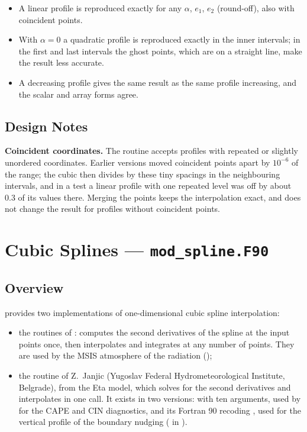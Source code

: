 \begin{itemize}
  \item A linear profile is reproduced exactly for any $\alpha$, $e_1$,
        $e_2$ (round-off), also with coincident points.
  \item With $\alpha = 0$ a quadratic profile is reproduced exactly in the
        inner intervals; in the first and last intervals the ghost points,
        which are on a straight line, make the result less accurate.
  \item A decreasing profile gives the same result as the same profile
        increasing, and the scalar and array forms agree.
\end{itemize}

\subsection{Design Notes}

\textbf{Coincident coordinates.} The routine accepts profiles with
repeated or slightly unordered coordinates. Earlier versions moved coincident points apart by
$10^{-6}$ of the range; the cubic then divides by these tiny spacings in
the neighbouring intervals, and in a test a linear profile with one
repeated level was off by about 0.3 of its values there. Merging the points
keeps the interpolation exact, and does not change the result for profiles
without coincident points.

\section{Cubic Splines --- \texttt{mod\_spline.F90}}
\label{sec:spline}

\subsection{Overview}

 provides two implementations of one-dimensional cubic
spline interpolation:
\begin{itemize}
  \item the routines of \citet{press1992}:  computes the
        second derivatives of the spline at the input points once, then
         interpolates and  integrates at any
        number of points. They are used by the MSIS atmosphere of the
        radiation ();
  \item the routine of Z.~Janjic (Yugoslav Federal Hydrometeorological
        Institute, Belgrade), from the Eta model, which solves for the
        second derivatives and interpolates in one call. It exists in two
        versions:  with ten arguments, used by
         for the CAPE and CIN diagnostics, and its Fortran
        90 recoding , used for the vertical profile of the
        boundary nudging ( in
        ).
\end{itemize}


